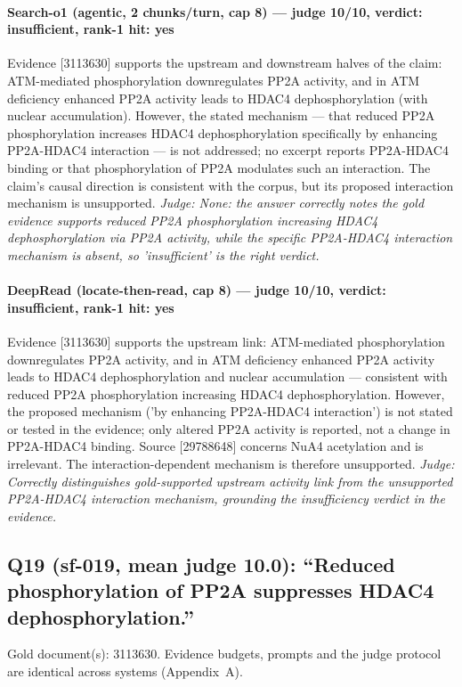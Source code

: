 \documentclass[sigconf, review, anonymous]{acmart}
\begin{document}
\paragraph{Search-o1 (agentic, 2 chunks/turn, cap 8) --- judge 10/10, verdict: insufficient, rank-1 hit: yes}
\noindent Evidence [3113630] supports the upstream and downstream halves of the claim: ATM-mediated phosphorylation downregulates PP2A activity, and in ATM deficiency enhanced PP2A activity leads to HDAC4 dephosphorylation (with nuclear accumulation). However, the stated mechanism --- that reduced PP2A phosphorylation increases HDAC4 dephosphorylation specifically by enhancing PP2A-HDAC4 interaction --- is not addressed; no excerpt reports PP2A-HDAC4 binding or that phosphorylation of PP2A modulates such an interaction. The claim's causal direction is consistent with the corpus, but its proposed interaction mechanism is unsupported.
\noindent\small\textit{Judge: None: the answer correctly notes the gold evidence supports reduced PP2A phosphorylation increasing HDAC4 dephosphorylation via PP2A activity, while the specific PP2A-HDAC4 interaction mechanism is absent, so 'insufficient' is the right verdict.}
\paragraph{DeepRead (locate-then-read, cap 8) --- judge 10/10, verdict: insufficient, rank-1 hit: yes}
\noindent Evidence [3113630] supports the upstream link: ATM-mediated phosphorylation downregulates PP2A activity, and in ATM deficiency enhanced PP2A activity leads to HDAC4 dephosphorylation and nuclear accumulation --- consistent with reduced PP2A phosphorylation increasing HDAC4 dephosphorylation. However, the proposed mechanism ('by enhancing PP2A-HDAC4 interaction') is not stated or tested in the evidence; only altered PP2A activity is reported, not a change in PP2A-HDAC4 binding. Source [29788648] concerns NuA4 acetylation and is irrelevant. The interaction-dependent mechanism is therefore unsupported.
\noindent\small\textit{Judge: Correctly distinguishes gold-supported upstream activity link from the unsupported PP2A-HDAC4 interaction mechanism, grounding the insufficiency verdict in the evidence.}

\subsection{Q19 (sf-019, mean judge 10.0): ``Reduced phosphorylation of PP2A suppresses HDAC4 dephosphorylation.''}
\label{app:q19}
\noindent Gold document(s): 3113630. Evidence budgets, prompts and the judge protocol are identical across systems (Appendix~A).
\end{document}
